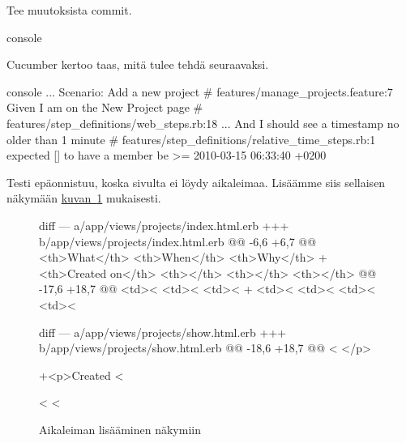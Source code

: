 \documentclass{article}
\newenvironment{myfigure}[1][tbp]{
  \begin{figure}[#1]
    \centering
    \begin{lrbox}{\myfigurebox}
      \begin{minipage}{\textwidth}
}{
      \end{minipage}
    \end{lrbox}
    \colorbox{blue!4}{\usebox{\myfigurebox}}
  \end{figure}
}
\newcommand{\myref}[2]{\hyperref[#2]{#1~\ref*{#2}}}
\begin{document}
\begin{samepage}
Tee muutoksista commit.

\begin{pygmented}{console}
\end{pygmented}
\end{samepage}

\begin{samepage}
Cucumber kertoo taas, mitä tulee tehdä seuraavaksi.

\begin{pygmented}{console}
...
  Scenario: Add a new project                           # features/manage_projects.feature:7
    Given I am on the New Project page                  # features/step_definitions/web_steps.rb:18
...
    And I should see a timestamp no older than 1 minute # features/step_definitions/relative_time_steps.rb:1
      expected [] to have a member be >= 2010-03-15 06:33:40 +0200
\end{pygmented}
\end{samepage}

\begin{samepage}
Testi epäonnistuu, koska sivulta ei löydy aikaleimaa. Lisäämme siis sellaisen
näkymään \myref{kuvan}{fig:projects-view-add-timestamps} mukaisesti.

\begin{myfigure}[H]
\caption{Aikaleiman lisääminen näkymiin}
\label{fig:projects-view-add-timestamps}

\begin{pygmented}{diff}
--- a/app/views/projects/index.html.erb
+++ b/app/views/projects/index.html.erb
@@ -6,6 +6,7 @@
     <th>What</th>
     <th>When</th>
     <th>Why</th>
+    <th>Created on</th>
     <th></th>
     <th></th>
     <th></th>
@@ -17,6 +18,7 @@
     <td><%
     <td><%
     <td><%
+    <td><%
     <td><%
     <td><%
     <td><%
\end{pygmented}

\begin{pygmented}{diff}
--- a/app/views/projects/show.html.erb
+++ b/app/views/projects/show.html.erb
@@ -18,6 +18,7 @@
   <%
 </p>
 
+<p>Created <%
 
 <%
 <%
\end{pygmented}
\end{myfigure}
\end{samepage}
\end{document}
